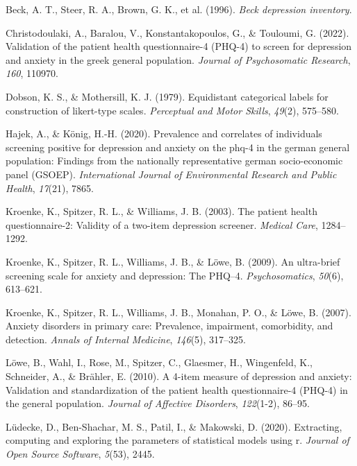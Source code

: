 \documentclass[
  man,
  floatsintext,
  longtable,
  nolmodern,
  notxfonts,
  notimes,
  colorlinks=true,linkcolor=blue,citecolor=blue,urlcolor=blue]{apa7}
\newlength{\cslhangindent}
\newenvironment{CSLReferences}[2] %
 {\begin{list}{}{%
  \setlength{\itemindent}{0pt}
  \setlength{\leftmargin}{0pt}
  \setlength{\parsep}{0pt}
  \ifodd #1
   \setlength{\leftmargin}{\cslhangindent}
   \setlength{\itemindent}{-1\cslhangindent}
  \fi
  \setlength{\itemsep}{#2\baselineskip}}}
 {\end{list}}
\begin{document}
\label{refs}
\begin{CSLReferences}{1}{0}
Beck, A. T., Steer, R. A., Brown, G. K., et al. (1996). \emph{Beck
depression inventory}.

Christodoulaki, A., Baralou, V., Konstantakopoulos, G., \& Touloumi, G.
(2022). Validation of the patient health questionnaire-4 (PHQ-4) to
screen for depression and anxiety in the greek general population.
\emph{Journal of Psychosomatic Research}, \emph{160}, 110970.

Dobson, K. S., \& Mothersill, K. J. (1979). Equidistant categorical
labels for construction of likert-type scales. \emph{Perceptual and
Motor Skills}, \emph{49}(2), 575--580.

Hajek, A., \& König, H.-H. (2020). Prevalence and correlates of
individuals screening positive for depression and anxiety on the phq-4
in the german general population: Findings from the nationally
representative german socio-economic panel (GSOEP). \emph{International
Journal of Environmental Research and Public Health}, \emph{17}(21),
7865.

Kroenke, K., Spitzer, R. L., \& Williams, J. B. (2003). The patient
health questionnaire-2: Validity of a two-item depression screener.
\emph{Medical Care}, 1284--1292.

Kroenke, K., Spitzer, R. L., Williams, J. B., \& Löwe, B. (2009). An
ultra-brief screening scale for anxiety and depression: The PHQ--4.
\emph{Psychosomatics}, \emph{50}(6), 613--621.

Kroenke, K., Spitzer, R. L., Williams, J. B., Monahan, P. O., \& Löwe,
B. (2007). Anxiety disorders in primary care: Prevalence, impairment,
comorbidity, and detection. \emph{Annals of Internal Medicine},
\emph{146}(5), 317--325.

Löwe, B., Wahl, I., Rose, M., Spitzer, C., Glaesmer, H., Wingenfeld, K.,
Schneider, A., \& Brähler, E. (2010). A 4-item measure of depression and
anxiety: Validation and standardization of the patient health
questionnaire-4 (PHQ-4) in the general population. \emph{Journal of
Affective Disorders}, \emph{122}(1-2), 86--95.

Lüdecke, D., Ben-Shachar, M. S., Patil, I., \& Makowski, D. (2020).
Extracting, computing and exploring the parameters of statistical models
using r. \emph{Journal of Open Source Software}, \emph{5}(53), 2445.


\end{CSLReferences}
\end{document}
